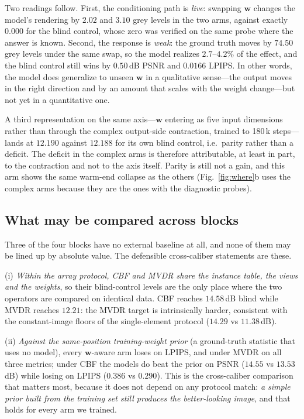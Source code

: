 \documentclass[conference]{IEEEtran}
\begin{document}
Two readings follow. First, the conditioning path is \emph{live}: swapping
$\mathbf{w}$ changes the model's rendering by $2.02$ and $3.10$ grey levels in
the two arms, against exactly $0.000$ for the blind control, whose zero was
verified on the same probe where the answer is known. Second, the response is
\emph{weak}: the ground truth moves by $74.50$ grey levels under the same swap,
so the model realizes $2.7$--$4.2\%$ of the effect, and the blind control still
wins by $0.50$\,dB PSNR and $0.0166$ LPIPS. In other words, the model does
generalize to unseen $\mathbf{w}$ in a qualitative sense---the output moves in
the right direction and by an amount that scales with the weight change---but
not yet in a quantitative one.

A third representation on the same axis---$\mathbf{w}$ entering as five input
dimensions rather than through the complex output-side contraction, trained to
180\,k steps---lands at $12.190$ against $12.188$ for its own blind control,
i.e.\ parity rather than a deficit. The deficit in the complex arms is therefore
attributable, at least in part, to the contraction and not to the axis itself.
Parity is still not a gain, and this arm shows the same warm-end collapse as the
others (Fig.~\ref{fig:where}b uses the complex arms because they are the ones
with the diagnostic probes).

\subsection{What may be compared across blocks}
\label{sec:cross}

Three of the four blocks have no external baseline at all, and none of them may
be lined up by absolute value. The defensible cross-caliber statements are
these.

(i) \emph{Within the array protocol, CBF and MVDR share the instance table,
the views and the weights}, so their blind-control levels are the only place
where the two operators are compared on identical data. CBF reaches
$14.58$\,dB blind while MVDR reaches $12.21$: the MVDR target is intrinsically
harder, consistent with the constant-image floors of the single-element protocol
($14.29$ vs $11.38$\,dB).

(ii) \emph{Against the same-position training-weight prior} (a ground-truth
statistic that uses no model), every $\mathbf{w}$-aware arm loses on LPIPS, and
under MVDR on all three metrics; under CBF the models do beat the prior on PSNR
($14.55$ vs $13.53$\,dB) while losing on LPIPS ($0.386$ vs $0.290$). This is the
cross-caliber comparison that matters most, because it does not depend on any
protocol match: \emph{a simple prior built from the training set still produces
the better-looking image}, and that holds for every arm we trained.
\end{document}
